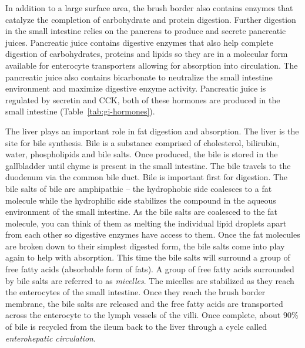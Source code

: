 \documentclass{tufte-handout}
\begin{document}
In addition to a large surface area, the brush border also contains enzymes that catalyze the completion of carbohydrate and protein digestion. Further digestion in the small intestine relies on the pancreas to produce and secrete pancreatic juices. Pancreatic juice contains digestive enzymes that also help complete digestion of carbohydrates, proteins and lipids so they are in a molecular form available for enterocyte transporters allowing for absorption into circulation. The pancreatic juice also contains bicarbonate to neutralize the small intestine environment and maximize digestive enzyme activity. Pancreatic juice is regulated by secretin and CCK, both of these hormones are produced in the small intestine (Table~\ref{tab:gi-hormones}). 

The liver plays an important role in fat digestion and absorption. The liver is the site for bile synthesis. Bile is a substance comprised of  cholesterol, bilirubin, water, phospholipids and bile salts. Once produced, the bile is stored in the gallbladder until chyme is present in the small intestine. The bile travels to the duodenum via the common bile duct. Bile is important first for digestion. The bile salts of bile are amphipathic – the hydrophobic side coalesces to a fat molecule while the hydrophilic side stabilizes the compound in the aqueous environment of the small intestine. As the bile salts are coalesced to the fat molecule, you can think of them as melting the individual lipid droplets apart from each other so digestive enzymes have access to them. Once the fat molecules are broken down to their simplest digested form, the bile salts come into play again to help with absorption. This time the bile salts will surround a group of free fatty acids (absorbable form of fats). A group of free fatty acids surrounded by bile salts are referred to as \emph{micelles}. The micelles are stabilized as they reach the enterocytes of the small intestine. Once they reach the brush border membrane, the bile salts are released and the free fatty acids are transported across the enterocyte to the lymph vessels of the villi. Once complete, about 90\% of bile is recycled from the ileum back to the liver through a cycle called \emph{enterohepatic circulation}.
\end{document}
